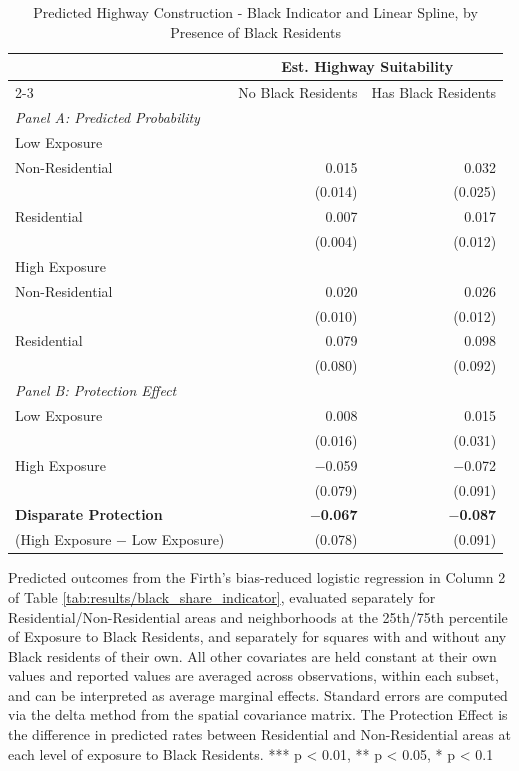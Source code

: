 \begin{table}[h]
\centering
\caption{Predicted Highway Construction - Black Indicator and Linear Spline, by Presence of Black Residents}
\label{tab:predicted_outcomes/black_share_sweep_logitinteraction_anyblack_bystratum}
\begin{threeparttable}
\begin{tabular*}{1\textwidth}{@{\extracolsep{\fill}}lr@{\hspace{1.2em}}r@{\hspace{1.2em}}}
\toprule
 & \multicolumn{2}{c}{Est. Highway Suitability} \\
\cmidrule(l){2-3}
 & No Black Residents & Has Black Residents \\
\midrule
\textit{Panel A: Predicted Probability} & & \\
\addlinespace[2pt]
Low Exposure & & \\
\quad Non-Residential & 0.015 & 0.032 \\
 & (0.014) & (0.025) \\[4pt]
\quad Residential & 0.007 & 0.017 \\
 & (0.004) & (0.012) \\[4pt]
High Exposure & & \\
\quad Non-Residential & 0.020 & 0.026 \\
 & (0.010) & (0.012) \\[4pt]
\quad Residential & 0.079 & 0.098 \\
 & (0.080) & (0.092) \\[4pt]
\midrule
\textit{Panel B: Protection Effect} & & \\
\addlinespace[2pt]
Low Exposure & 0.008 & 0.015 \\
 & (0.016) & (0.031) \\[4pt]
High Exposure & $-$0.059 & $-$0.072 \\
 & (0.079) & (0.091) \\[4pt]
\addlinespace[2pt]
\textbf{Disparate Protection} & \textbf{$-$0.067} & \textbf{$-$0.087} \\
(High Exposure $-$ Low Exposure) & (0.078) & (0.091) \\
\bottomrule
\end{tabular*}
\begin{tablenotes}[flushleft]
\footnotesize
\item Predicted outcomes from the Firth's bias-reduced logistic regression in Column 2 of Table \ref{tab:results/black_share_indicator}, evaluated separately for Residential/Non-Residential areas and neighborhoods at the 25th/75th percentile of Exposure to Black Residents, and separately for squares with and without any Black residents of their own. All other covariates are held constant at their own values and reported values are averaged across observations, within each subset, and can be interpreted as average marginal effects. Standard errors are computed via the delta method from the spatial covariance matrix. The Protection Effect is the difference in predicted rates between Residential and Non-Residential areas at each level of exposure to Black Residents. *** p < 0.01, ** p < 0.05, * p < 0.1
\end{tablenotes}
\end{threeparttable}
\end{table}
